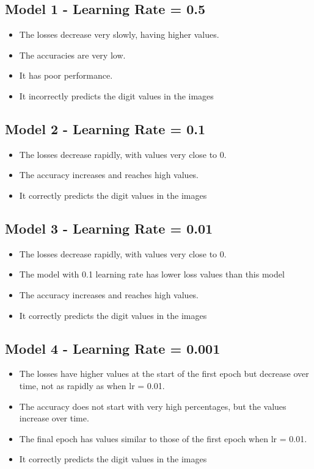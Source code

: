 \documentclass{article}
\begin{document}
\subsection*{Model 1 - Learning Rate = 0.5}
\begin{itemize}
  \item The losses decrease very slowly, having higher values.
  \item The accuracies are very low.
  \item It has poor performance.
  \item It incorrectly predicts the digit values in the images
\end{itemize}

\subsection*{Model 2 - Learning Rate = 0.1}
\begin{itemize}
  \item The losses decrease rapidly, with values very close to 0.
  \item The accuracy increases and reaches high values.
  \item It correctly predicts the digit values in the images
\end{itemize}

\subsection*{Model 3 - Learning Rate = 0.01}
\begin{itemize}
  \item The losses decrease rapidly, with values very close to 0.
  \item The model with 0.1 learning rate has lower loss values than this model
  \item The accuracy increases and reaches high values.
  \item It correctly predicts the digit values in the images
\end{itemize}

\subsection*{Model 4 - Learning Rate = 0.001}
\begin{itemize}
  \item The losses have higher values at the start of the first epoch but decrease over time, not as rapidly as when lr = 0.01.
  \item The accuracy does not start with very high percentages, but the values increase over time.
  \item The final epoch has values similar to those of the first epoch when lr = 0.01.
  \item It correctly predicts the digit values in the images
\end{itemize}
\end{document}
